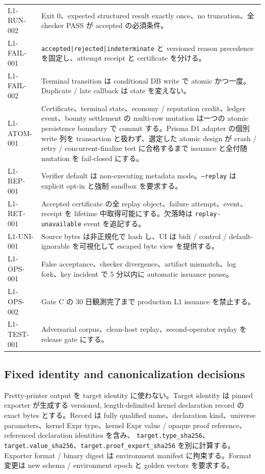 \documentclass[a4paper,11pt]{ltjsarticle}
\newcommand{\code}[1]{\texttt{#1}}
\begin{document}
\begin{longtable}{@{}L{28mm}L{127mm}@{}}
L1-RUN-002 & Exit 0、expected structured result exactly once、no truncation、全 checker PASS が accepted の必須条件。 \\
L1-FAIL-001 & \code{accepted|rejected|indeterminate} と versioned reason precedence を固定し、attempt receipt と certificate を分ける。 \\
L1-FAIL-002 & Terminal transition は conditional DB write で atomic かつ一度。Duplicate / late callback は state を変えない。 \\
L1-ATOM-001 & Certificate、terminal state、economy / reputation credit、ledger event、bounty settlement の multi-row mutation は一つの atomic persistence boundary で commit する。Prisma D1 adapter の個別 write 列を transaction と扱わず、選定した atomic design が crash / retry / concurrent-finalize test に合格するまで issuance と全付随 mutation を fail-closed にする。 \\
L1-REP-001 & Verifier default は non-executing metadata mode。\code{--replay} は explicit opt-in と強制 sandbox を要求する。 \\
L1-RET-001 & Accepted certificate の全 replay object、failure attempt、event、receipt を lifetime 中取得可能にする。欠落時は \code{replay-unavailable} event を追記する。 \\
L1-UNI-001 & Source bytes は非正規化で hash し、UI は bidi / control / default-ignorable を可視化して escaped byte view を提供する。 \\
L1-OPS-001 & False acceptance、checker divergence、artifact mismatch、log fork、key incident で 5 分以内に automatic issuance pause。 \\
L1-OPS-002 & Gate C の 30 日観測完了まで production L1 issuance を禁止する。 \\
L1-TEST-001 & Adversarial corpus、clean-host replay、second-operator replay を release gate にする。 \\
\bottomrule
\end{longtable}

\subsection{Fixed identity and canonicalization decisions}

Pretty-printer output を target identity に使わない。Target identity は pinned exporter が生成する versioned,
length-delimited kernel declaration record の exact bytes とする。Record は fully qualified name、declaration kind、universe
parameters、kernel Expr type、kernel Expr value / opaque proof reference、referenced declaration identities を含み、
\code{target.type\_sha256}、\code{target.value\_sha256}、\code{target.proof\_export\_sha256} を別に計算する。Exporter format / binary
digest は environment manifest に拘束する。Format 変更は new schema / environment epoch と golden vectors を要求する。
\end{document}

